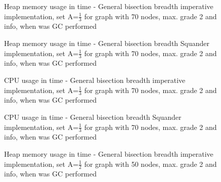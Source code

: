 \documentclass[11pt,twoside,a4paper]{book}
\begin{document}
\begin{figure}
\begin{center}

\caption{Heap memory usage in time - General bisection breadth imperative
implementation, set A=$\frac{1}{3}$ for graph with 70 nodes, max. grade 2 and
info, when was GC performed}
\label{fig:gbbIHeap90213}
\end{center}
\end{figure}


\begin{figure}
\begin{center}

\caption{Heap memory usage in time - General bisection breadth Squander
implementation, set A=$\frac{1}{3}$ for graph with 70 nodes, max. grade 2 and
info, when was GC performed}
\label{fig:gbbSHeap90213}
\end{center}
\end{figure}



\begin{figure}
\begin{center}

\caption{CPU usage in time - General bisection breadth imperative
implementation, set A=$\frac{1}{3}$ for graph with 70 nodes, max. grade 2 and
info, when was GC performed}
\label{fig:gbbICpu70213}
\end{center}
\end{figure}




\begin{figure}
\begin{center}

\caption{CPU usage in time - General bisection breadth Squander
implementation, set A=$\frac{1}{3}$ for graph with 70 nodes, max. grade 2 and
info, when was GC performed}
\label{fig:gbbSCpu70213}
\end{center}
\end{figure}


\begin{figure}
\begin{center}

\caption{Heap memory usage in time - General bisection breadth imperative
implementation, set A=$\frac{1}{2}$ for graph with 50 nodes, max. grade 2 and
info, when was GC performed}
\label{fig:gbbIHeap50212}
\end{center}
\end{figure}
\end{document}
